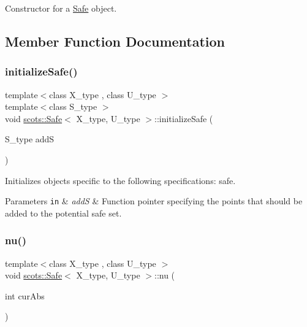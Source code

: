 Constructor for a \hyperlink{classscots_1_1Safe}{Safe} object. 

\subsection{Member Function Documentation}
\mbox{\label{classscots_1_1Safe_a8255c8172548f64907fedaddfcae9519}} 
\subsubsection{\texorpdfstring{initialize\+Safe()}{initializeSafe()}}
{\footnotesize\ttfamily template$<$class X\+\_\+type , class U\+\_\+type $>$ \\
template$<$class S\+\_\+type $>$ \\
void \hyperlink{classscots_1_1Safe}{scots\+::\+Safe}$<$ X\+\_\+type, U\+\_\+type $>$\+::initialize\+Safe (\begin{DoxyParamCaption}\item[{S\+\_\+type}]{addS }\end{DoxyParamCaption})\hspace{0.3cm}{\ttfamily [inline]}}

Initializes objects specific to the following specifications\+: safe. 
\begin{DoxyParams}[1]{Parameters}
\mbox{\tt in}  & {\em addS} & Function pointer specifying the points that should be added to the potential safe set. \\
\hline
\end{DoxyParams}
\mbox{\label{classscots_1_1Safe_ac9f2578f6b74602510ca5db4b2ef31b9}} 
\subsubsection{\texorpdfstring{nu()}{nu()}}
{\footnotesize\ttfamily template$<$class X\+\_\+type , class U\+\_\+type $>$ \\
void \hyperlink{classscots_1_1Safe}{scots\+::\+Safe}$<$ X\+\_\+type, U\+\_\+type $>$\+::nu (\begin{DoxyParamCaption}\item[{int}]{cur\+Abs }\end{DoxyParamCaption})\hspace{0.3cm}{\ttfamily [inline]}}

